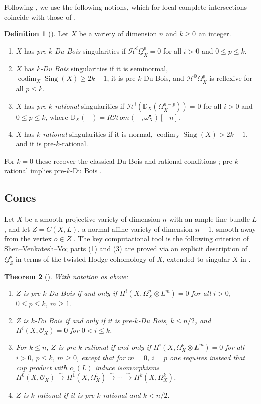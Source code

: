 \documentclass[11pt]{amsart}
\numberwithin{equation}{section}
\theoremstyle{plain}
\newtheorem{theorem}{Theorem}[section]
\theoremstyle{definition}
\newtheorem{definition}[theorem]{Definition}
\theoremstyle{remark}
\newcommand{\cO}{\mathcal{O}}
\newcommand{\cH}{\mathcal{H}}
\newcommand{\DuBois}[1]{\underline{\Omega}^{#1}}
\newcommand{\Sing}{\operatorname{Sing}}
\newcommand{\codim}{\operatorname{codim}}
\begin{document}
Following \cite{SVV}, we use the following notions, which for local complete intersections coincide with those of \cite{MOPW,JKSY,MP,CDM,FL}.

\begin{definition}[{\cite[Def.~1.1, 1.2, 1.3]{SVV}}]\label{def:higherDB}
Let $X$ be a variety of dimension $n$ and $k\ge0$ an integer.
\begin{enumerate}
\item $X$ has \emph{pre-$k$-Du Bois} singularities if $\cH^i\DuBois{p}_X=0$ for all $i>0$ and $0\le p\le k$.
\item $X$ has \emph{$k$-Du Bois} singularities if it is seminormal, $\codim_X\Sing(X)\ge 2k+1$, it is pre-$k$-Du Bois, and $\cH^0\DuBois{p}_X$ is reflexive for all $p\le k$.
\item $X$ has \emph{pre-$k$-rational} singularities if $\cH^i(\mathbb{D}_X(\DuBois{n-p}_X))=0$ for all $i>0$ and $0\le p\le k$, where $\mathbb{D}_X(-)=R\mathcal{H}om(-,\omega^\bullet_X)[-n]$.
\item $X$ has \emph{$k$-rational} singularities if it is normal, $\codim_X\Sing(X)> 2k+1$, and it is pre-$k$-rational.
\end{enumerate}
For $k=0$ these recover the classical Du Bois and rational conditions \cite[Prop.~5.5]{SVV}; pre-$k$-rational implies pre-$k$-Du Bois \cite[Thm.~B]{SVV}.
\end{definition}

\subsection{Cones}\label{ssec:cones}
Let $X$ be a smooth projective variety of dimension $n$ with an ample line bundle $L$, and let $Z=C(X,L)$, a normal affine variety of dimension $n+1$, smooth away from the vertex $o\in Z$ \cite[\S3.1]{Kol}.
The key computational tool is the following criterion of Shen--Venkatesh--Vo; parts (1) and (3) are proved via an explicit description of $\DuBois{p}_Z$ in terms of the twisted Hodge cohomology of $X$, extended to singular $X$ in \cite{PS}.

\begin{theorem}[{\cite[Prop.~F]{SVV}}]\label{thm:SVVcone}
With notation as above:
\begin{enumerate}
\item $Z$ is pre-$k$-Du Bois if and only if
$H^i(X,\Omega^p_X\otimes L^m)=0$ for all $i>0$, $0\le p\le k$, $m\ge1$.
\item $Z$ is $k$-Du Bois if and only if it is pre-$k$-Du Bois, $k\le n/2$, and $H^i(X,\cO_X)=0$ for $0<i\le k$.
\item For $k\le n$, $Z$ is pre-$k$-rational if and only if
$H^i(X,\Omega^p_X\otimes L^m)=0$ for all $i>0$, $p\le k$, $m\ge0$, except that for $m=0$, $i=p$ one requires instead that cup product with $c_1(L)$ induce isomorphisms
$H^0(X,\cO_X)\xrightarrow{\sim}H^1(X,\Omega^1_X)\xrightarrow{\sim}\cdots\xrightarrow{\sim}H^k(X,\Omega^k_X)$.
\item $Z$ is $k$-rational if it is pre-$k$-rational and $k<n/2$.
\end{enumerate}
\end{theorem}
\end{document}
